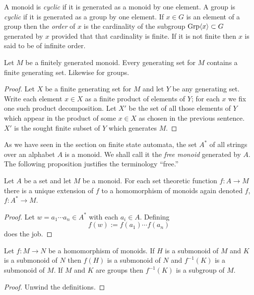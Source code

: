 \begin{defns} A monoid is \emph{cyclic} if it is generated as a monoid by one
    element. A group is \emph{cyclic} if it is generated as a group by one
    element. If $x\in G$ is an element of a group then the \emph{order} of $x$
    is the cardinality of the subgroup $\mathrm{Grp}\langle x\rangle \subset G$ generated by $x$
    provided that that cardinality is finite. If it is not finite then $x$ is
    said to be of infinite order.
\end{defns}

\begin{prop} Let $M$ be a finitely generated monoid. Every generating set for
    $M$ contains a finite generating set. Likewise for groups.
\end{prop}
\begin{proof} Let $X$ be a finite generating set for $M$ and let $Y$ be any
    generating set. Write each element $x \in X$ as a finite product of
    elements of $Y$; for each $x$ we fix one such product decomposition. Let
    $X'$ be the set of all those elements of $Y$ which appear in the product of
    some $x\in X$ as chosen in the previous sentence. $X'$ is the sought finite
    subset of $Y$ which generates $M$.
\end{proof}

\begin{ap} As we have seen in the section on finite state automata, the set
    $A^*$ of all strings over an alphabet $A$ is a monoid. We shall call it the
    \emph{free monoid} generated by $A$. The following proposition justifies
    the terminology ``free.''
\end{ap}

\begin{prop} Let $A$ be a set and let $M$ be a monoid. For each set theoretic
    function $f: A \rightarrow M$ there is a unique extension of $f$ to a
    homomorphism of monoids again denoted $f$, $f : A^* \rightarrow M$.
\end{prop}
\begin{proof} Let $w=a_1\cdots a_n \in A^*$ with each $a_i \in A$. Defining
    \[f(w) := f(a_1)\cdots f(a_n)\] does the job.
\end{proof}

\begin{prop} Let $f: M\rightarrow N$ be a homomorphism of monoids. If $H$ is a
    submonoid of $M$ and $K$ is a submonoid of $N$ then $f(H)$ is a submonoid
    of $N$ and $f^{-1}(K)$ is a submonoid of $M$. If $M$ and $K$ are groups
    then $f^{-1}(K)$ is a subgroup of $M$.
\end{prop}
\begin{proof} Unwind the definitions.
\end{proof}

